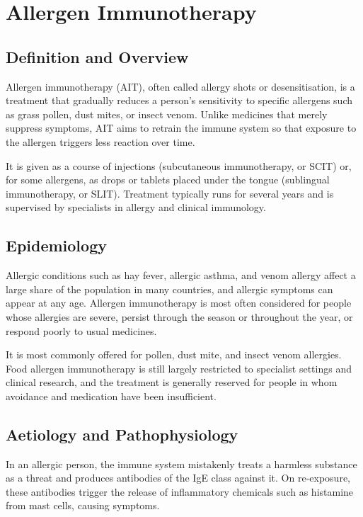 \chapter{Allergen Immunotherapy}

\section*{Definition and Overview}
Allergen immunotherapy (AIT), often called allergy shots or desensitisation, is a treatment that gradually reduces a person's sensitivity to specific allergens such as grass pollen, dust mites, or insect venom. Unlike medicines that merely suppress symptoms, AIT aims to retrain the immune system so that exposure to the allergen triggers less reaction over time.

It is given as a course of injections (subcutaneous immunotherapy, or SCIT) or, for some allergens, as drops or tablets placed under the tongue (sublingual immunotherapy, or SLIT). Treatment typically runs for several years and is supervised by specialists in allergy and clinical immunology.

\section*{Epidemiology}
Allergic conditions such as hay fever, allergic asthma, and venom allergy affect a large share of the population in many countries, and allergic symptoms can appear at any age. Allergen immunotherapy is most often considered for people whose allergies are severe, persist through the season or throughout the year, or respond poorly to usual medicines.

It is most commonly offered for pollen, dust mite, and insect venom allergies. Food allergen immunotherapy is still largely restricted to specialist settings and clinical research, and the treatment is generally reserved for people in whom avoidance and medication have been insufficient.

\section*{Aetiology and Pathophysiology}
In an allergic person, the immune system mistakenly treats a harmless substance as a threat and produces antibodies of the IgE class against it. On re-exposure, these antibodies trigger the release of inflammatory chemicals such as histamine from mast cells, causing symptoms.

